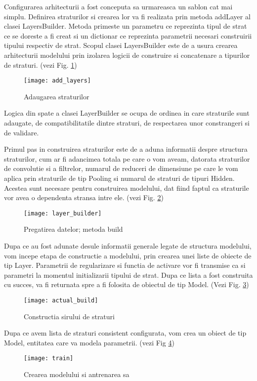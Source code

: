 	Configurarea arhitecturii a fost conceputa sa urmareasca un sablon cat mai simplu. Definirea straturilor si crearea lor va fi realizata prin metoda addLayer al clasei LayersBuilder. Metoda primeste un parametru ce reprezinta tipul de strat ce se doreste a fi creat si un dictionar ce reprezinta parametrii necesari construirii tipului respectiv de strat. Scopul clasei LayersBuilder este de a usura crearea arhitecturii modelului prin izolarea logicii de construire si concatenare a tipurilor de straturi. (vezi Fig. \ref{fig:add_layers})	
	
	\begin{figure}[H]
		\texttt{[image: add\_layers]}
		\caption{\label{fig:add_layers} Adaugarea straturilor}
	\end{figure}

	Logica din spate a clasei LayerBuilder se ocupa de ordinea in care straturile sunt adaugate, de  compatibilitatile dintre straturi, de respectarea unor constrangeri si de validare.
	
	Primul pas in construirea straturilor este de a aduna informatii despre structura straturilor, cum ar fi adancimea totala pe care o vom aveam, datorata straturilor de convolutie si a filtrelor,  numarul de reduceri de dimensiune pe care le vom aplica prin straturile de tip Pooling si numarul de straturi de tipuri Hidden. Acestea sunt necesare pentru construirea modelului, dat fiind faptul ca straturile vor avea o dependenta stransa intre ele.  (vezi Fig. \ref{fig:layer_builder})
	
	\begin{figure}[H]
		\texttt{[image: layer\_builder]}
		\caption{\label{fig:layer_builder} Pregatirea datelor; metoda build}
	\end{figure}
	
	\vfill
	

	Dupa ce au fost adunate desule informatii generale legate de structura modelului, vom incepe etapa de constructie a modelului, prin crearea unei liste de obiecte de tip Layer. Parametrii de regularizare si functia de activare vor fi transmise ca si parametri la momentul initializarii tipului de strat. Dupa ce lista a fost construita cu succes,  va fi returnata spre a fi folosita de obiectul de tip Model. (Vezi Fig. \ref{fig:actual_build})
	
	
	\begin{figure}[H]
		\texttt{[image: actual\_build]}
		\caption{\label{fig:actual_build} Constructia sirului de straturi}
	\end{figure}

	\newpage

	Dupa ce avem lista de straturi consistent configurata, vom crea un obiect de tip Model, entitatea care va modela parametrii. (vezi Fig \ref{fig:train})
	
	\begin{figure}[H]
		\texttt{[image: train]}
		\caption{\label{fig:train} Crearea modelului si antrenarea sa}
	\end{figure}
	

